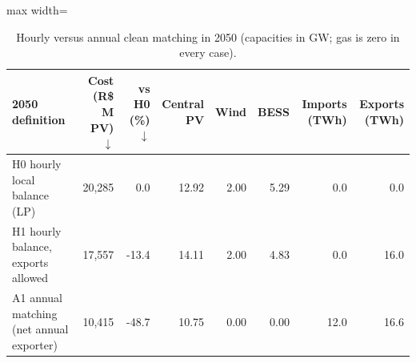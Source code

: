 \begin{table}[!htbp]
\centering
\scriptsize
\caption{Hourly versus annual clean matching in 2050 (capacities in GW; gas is zero in every case).}
\label{tab:matching}
\begin{adjustbox}{max width=\linewidth}
\begin{tabular}{lrrrrrrr}
\toprule
2050 definition & Cost (R\$ M PV) $\downarrow$ & vs H0 (\%) $\downarrow$ & Central PV & Wind & BESS & Imports (TWh) & Exports (TWh) \\
\midrule
H0 hourly local balance (LP) & 20,285 & 0.0 & 12.92 & 2.00 & 5.29 & 0.0 & 0.0 \\
H1 hourly balance, exports allowed & 17,557 & -13.4 & 14.11 & 2.00 & 4.83 & 0.0 & 16.0 \\
A1 annual matching (net annual exporter) & 10,415 & -48.7 & 10.75 & 0.00 & 0.00 & 12.0 & 16.6 \\
\bottomrule
\end{tabular}
\end{adjustbox}
\end{table}
